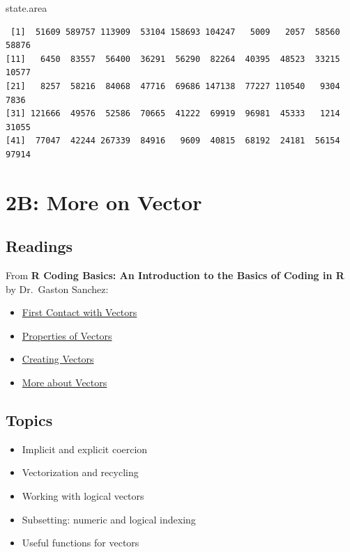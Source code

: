 \documentclass[
  letterpaper,
  DIV=11,
  numbers=noendperiod]{scrreprt}
\newenvironment{Shaded}{\begin{snugshade}}{\end{snugshade}}
\newcommand{\NormalTok}[1]{\textcolor[rgb]{0.00,0.23,0.31}{#1}}
\begin{document}
\begin{tcolorbox}
\begin{Shaded}
\begin{Highlighting}[]
\NormalTok{state.area}
\end{Highlighting}
\end{Shaded}

\begin{verbatim}
 [1]  51609 589757 113909  53104 158693 104247   5009   2057  58560  58876
[11]   6450  83557  56400  36291  56290  82264  40395  48523  33215  10577
[21]   8257  58216  84068  47716  69686 147138  77227 110540   9304   7836
[31] 121666  49576  52586  70665  41222  69919  96981  45333   1214  31055
[41]  77047  42244 267339  84916   9609  40815  68192  24181  56154  97914
\end{verbatim}

\end{tcolorbox}

\chapter{2B: More on Vector}\label{b-more-on-vector}

\section{Readings}\label{readings-1}

From \textbf{R Coding Basics: An Introduction to the Basics of Coding in
R} by Dr.~Gaston Sanchez:

\begin{itemize}
\item
  \href{https://www.gastonsanchez.com/R-coding-basics/1-01-vectors-intro.html}{First
  Contact with Vectors}
\item
  \href{https://www.gastonsanchez.com/R-coding-basics/1-02-vectors-properties.html}{Properties
  of Vectors}
\item
  \href{https://www.gastonsanchez.com/R-coding-basics/1-03-vectors-creation.html}{Creating
  Vectors}
\item
  \href{https://www.gastonsanchez.com/R-coding-basics/1-04-vectors-concepts.html}{More
  about Vectors}
\end{itemize}

\section{Topics}\label{topics-2}

\begin{itemize}
\item
  Implicit and explicit coercion
\item
  Vectorization and recycling
\item
  Working with logical vectors
\item
  Subsetting: numeric and logical indexing
\item
  Useful functions for vectors
\end{itemize}
\end{document}
